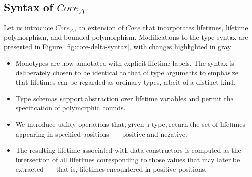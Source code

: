 \documentclass[acmsmall,review,screen]{acmart}
\begin{document}
\subsection{Syntax of $Core_\Delta$}

Let us introduce $Core_\Delta$, an extension of $Core$ that incorporates lifetimes, lifetime polymorphism, and bounded polymorphism.
Modifications to the type syntax are presented in Figure~\ref{fig:core-delta-syntax}, with changes highlighted in gray.
\begin{itemize}
    \item Monotypes are now annotated with explicit lifetime labels.
    The syntax is deliberately chosen to be identical to that of type arguments to emphasize that lifetimes can be regarded as ordinary types, albeit of a distinct kind.
    \item Type schemas support abstraction over lifetime variables and permit the specification of polymorphic bounds.
    \item We introduce utility operations that, given a type, return the set of lifetimes appearing in specified positions~--- positive and negative. %
    \item The resulting lifetime associated with data constructors is computed as the intersection of all lifetimes corresponding to those values that may later be extracted~--- that is, lifetimes encountered in positive positions.
\end{itemize}

\end{document}
